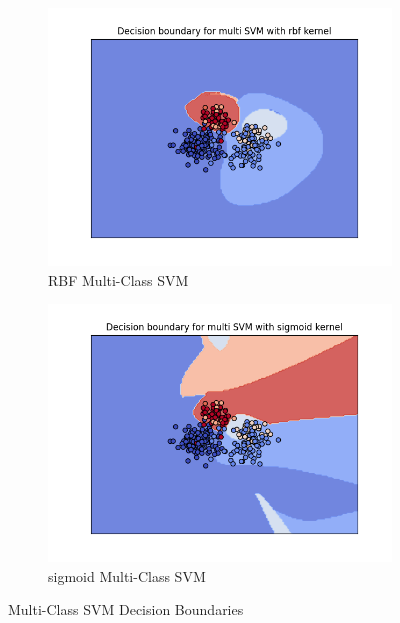 \documentclass[12pt]{article}
\begin{document}
\begin{figure}
\begin{subfigure}{0.45\textwidth}
        \includegraphics[width=\textwidth]{plots/rbf_multi.png}
        \caption{RBF Multi-Class SVM}
    \end{subfigure}
    \begin{subfigure}{0.45\textwidth}
        \centering
        \includegraphics[width=\textwidth]{plots/sigmoid_multi.png}
        \caption{sigmoid Multi-Class SVM}
    \end{subfigure}
    \caption{Multi-Class SVM Decision Boundaries}
\end{figure}
\FloatBarrier 
\end{document}
